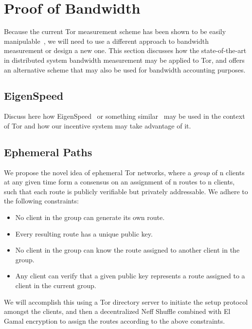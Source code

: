 \section{Proof of Bandwidth}

Because the current Tor measurement scheme has been shown to be easily manipulable~\cite{biryukov2013trawling}, we will need to use a different approach to bandwidth measurement or design a new one. This section discusses how the state-of-the-art in distributed system bandwidth measurement may be applied to Tor, and offers an alternative scheme that may also be used for bandwidth accounting purposes.

\subsection{EigenSpeed}

Discuss here how EigenSpeed~\cite{snader2009eigenspeed} or something similar~\cite{snader2008tune, snader2011improving} may be used in the context of Tor and how our incentive system may take advantage of it.

\subsection{Ephemeral Paths}

We propose the novel idea of ephemeral Tor networks, where a \textit{group} of n clients at any given time form a consensus on an assignment of n routes to n clients, such that each route is publicly verifiable but privately addressable. We adhere to the following constraints:

\begin{itemize}
  \item No client in the group can generate its own route.
  \item Every resulting route has a unique public key.
  \item No client in the group can know the route assigned to another client in the group.
  \item Any client can verify that a given public key represents a route assigned to a client in the current group.
\end{itemize}

We will accomplish this using a Tor directory server to initiate the setup protocol amongst the clients, and then a decentralized Neff Shuffle combined with El Gamal encryption to assign the routes according to the above constraints.

